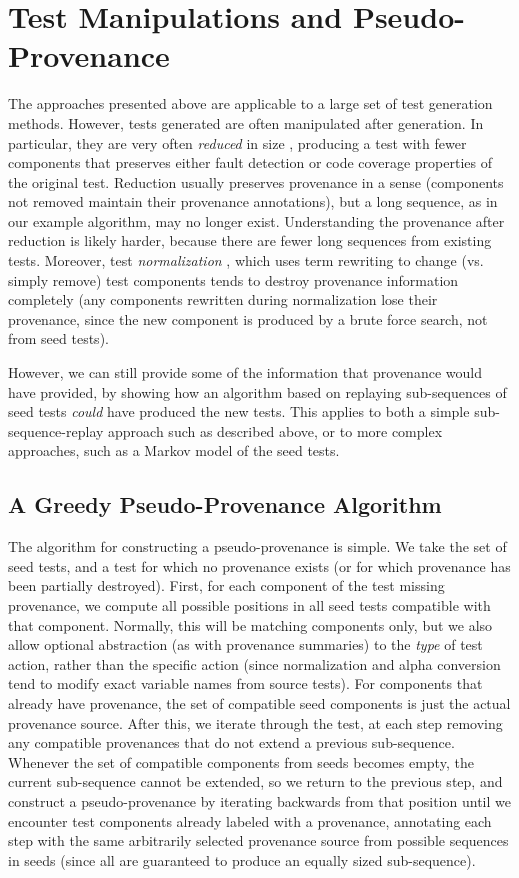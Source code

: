\documentclass[final]{article}
\begin{document}
\section{Test Manipulations and Pseudo-Provenance}

The approaches presented above are applicable to a large set of test
generation methods.  However, tests generated are often manipulated
after generation.  In particular, they are very often \emph{reduced}
in size \cite{DD}, producing a test with fewer components that
preserves either fault detection or code coverage \cite{icst2014}
properties of the original test.  Reduction usually preserves
provenance in a sense (components not removed maintain their
provenance annotations), but a long sequence, as in our example
algorithm, may no longer exist.  Understanding the provenance after
reduction is likely harder, because there are fewer long sequences
from existing tests.  Moreover, test \emph{normalization} \cite{Groce:2017:OTR:3092703.3092704}, which uses
term rewriting to change (vs. simply remove) test components tends to
destroy provenance information completely (any components rewritten
during normalization
lose their provenance, since the new component is produced by a brute
force search, not from seed tests).

However, we can still provide some of the information that provenance
would have provided, by showing how an algorithm based on replaying
sub-sequences of seed tests \emph{could} have produced the new tests.
This applies to both a simple sub-sequence-replay approach such as
described above, or to more complex approaches, such as a Markov model
of the seed tests.

\subsection{A Greedy Pseudo-Provenance Algorithm}

The algorithm for constructing a pseudo-provenance is simple.  We take
the set of seed tests, and a test for which no provenance exists (or
for which provenance has been partially destroyed).  First, for each
component of the test missing provenance, we compute all possible
positions in all seed tests compatible with that component.  Normally,
this will be matching components only, but we also allow optional abstraction
(as with provenance summaries) to the \emph{type} of test action,
rather than the specific action (since normalization and alpha
conversion tend to modify exact variable names from source tests).
For components that already have provenance, the set of compatible
seed components is just the actual provenance source.   After this, we
iterate through the test, at each step removing any compatible
provenances that do not extend a previous sub-sequence.  Whenever the
set of compatible components from seeds becomes empty, the current
sub-sequence cannot be extended, so we return to the previous step,
and construct a pseudo-provenance by iterating backwards from that
position until we encounter test components already labeled with a
provenance, annotating each step with the same arbitrarily selected
provenance source from possible sequences in seeds (since all are guaranteed to produce an equally sized
sub-sequence).
\end{document}
